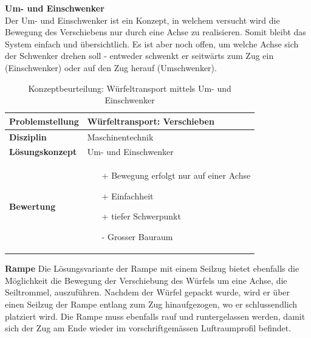 \documentclass[../../main.tex]{subfiles}
\begin{document}
\textbf{Um- und Einschwenker}\\
Der Um- und Einschwenker ist ein Konzept, in welchem versucht wird die Bewegung des Verschiebens nur durch eine Achse zu realisieren. Somit bleibt das System einfach und übersichtlich. Es ist aber noch offen, um welche Achse sich der Schwenker drehen soll - entweder schwenkt er seitwärts zum Zug ein (Einschwenker) oder auf den Zug herauf (Umschwenker).

\begin{flushleft}
    \begin{table}[h]
    \begin{tabular}{ | l | p{11cm} |}
    \hline
    \textbf{Problemstellung} & Würfeltransport: Verschieben \\ \hline
    \textbf{Disziplin} & Maschinentechnik \\ \hline
    \textbf{Lösungskonzept} &  Um- und Einschwenker \\ \hline
    \textbf{Bewertung} &  \begin{itemize}
                            \item[+] Bewegung erfolgt nur auf einer Achse
                            \item[+] Einfachheit
                            \item[+] tiefer Schwerpunkt
                            \item[-] Grosser Bauraum
                          \end{itemize} \\ \hline
    \end{tabular}
    \caption{Konzeptbeurteilung: Würfeltransport mittels Um- und Einschwenker}
    \label{tab:konzept_wurfeltrransport_umschwenker}
\end{table}
\end{flushleft}
\textbf{Rampe}
Die Lösungsvariante der Rampe mit einem Seilzug bietet ebenfalls die Möglichkeit die Bewegung der Verschiebung des Würfels um eine Achse, die Seiltrommel, auszuführen. Nachdem der Würfel gepackt wurde, wird er über einen Seilzug der Rampe entlang zum Zug hinaufgezogen, wo er schlussendlich platziert wird. Die Rampe muss ebenfalls rauf und runtergelassen werden, damit sich der Zug am Ende wieder im vorschriftgemässen Luftraumprofil befindet.
\end{document}
